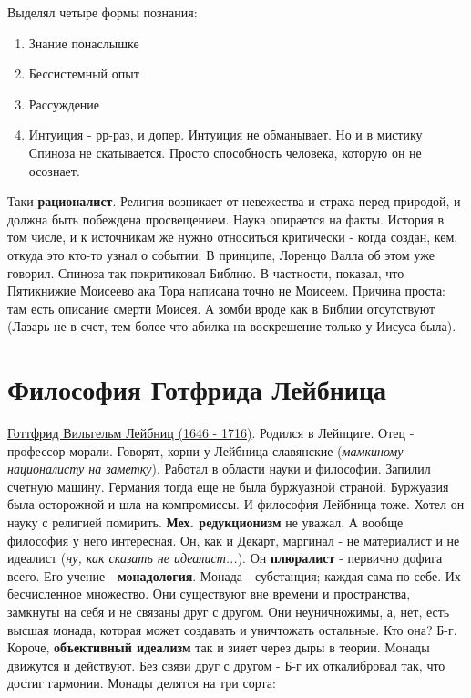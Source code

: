 Выделял четыре формы познания:
\begin{enumerate}
\item Знание понаслышке
\item Бессистемный опыт
\item Рассуждение
\item Интуиция - рр-раз, и допер. Интуиция не обманывает. Но и в мистику Спиноза не скатывается. Просто способность человека, которую он не осознает. 
\end{enumerate}
Таки \textbf{рационалист}. Религия возникает от невежества и страха перед природой, и должна быть побеждена просвещением. Наука опирается на факты. История в том числе, и к источникам же нужно относиться критически - когда создан, кем, откуда это кто-то узнал о событии. В принципе, Лоренцо Валла об этом уже говорил. Спиноза так покритиковал Библию. В частности, показал, что Пятикнижие Моисеево ака Тора написана точно не Моисеем. Причина проста: там есть описание смерти Моисея. А зомби вроде как в Библии отсутствуют (Лазарь не в счет, тем более что абилка на воскрешение только у Иисуса была).

\section{Философия Готфрида Лейбница}
\underline{Готтфрид Вильгельм Лейбниц (1646 - 1716)}. Родился в Лейпциге. Отец - профессор морали. Говорят, корни у Лейбница славянские (\textit{мамкиному националисту на заметку}). Работал в области науки и философии. Запилил счетную машину. Германия тогда еще не была буржуазной страной. Буржуазия была осторожной и шла на компромиссы. И философия Лейбница тоже. Хотел он науку с религией помирить. \textbf{Мех. редукционизм} не уважал. А вообще философия у него интересная. Он, как и Декарт, маргинал - не материалист и не идеалист (\textit{ну, как сказать не идеалист...}). Он \textbf{плюралист} - первично дофига всего. Его учение - \textbf{монадология}. Монада - субстанция; каждая сама по себе. Их бесчисленное множество. Они существуют вне времени и пространства, замкнуты на себя и не связаны друг с другом. Они неуничножимы, а, нет, есть высшая монада, которая может создавать и уничтожать остальные. Кто она? Б-г. Короче, \textbf{объективный идеализм} так и зияет через дыры в теории. Монады движутся и действуют. Без связи друг с другом - Б-г их откалибровал так, что достиг гармонии. Монады делятся на три сорта:

